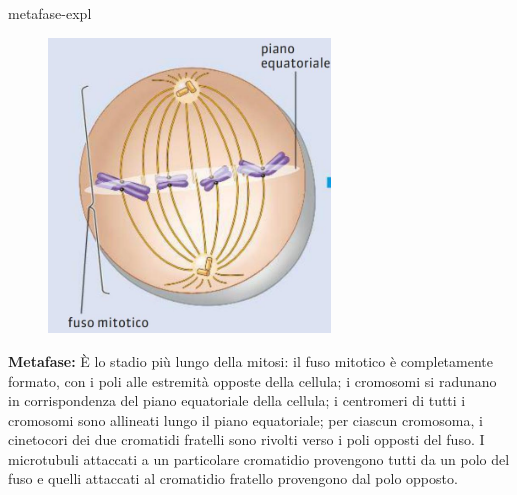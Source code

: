 \documentclass[preview]{standalone}
\begin{document}
\begin{snippet}{metafase-expl}
    \setlength{\intextsep}{0pt}%
    \begin{figure}
        \includegraphics[width=7.5cm]{./resources/metafase.jpg}
        \vspace{-1cm}
    \end{figure}

    \textbf{Metafase:}
    È lo stadio più lungo della mitosi: il fuso mitotico è completamente formato, con i poli alle
    estremità opposte della cellula; i cromosomi si radunano in corrispondenza del piano
    equatoriale della cellula; i centromeri di tutti i cromosomi sono allineati lungo il piano
    equatoriale; per ciascun cromosoma, i cinetocori dei due cromatidi fratelli sono rivolti verso
    i poli opposti del fuso. I microtubuli attaccati a un particolare cromatidio provengono tutti da
    un polo del fuso e quelli attaccati al cromatidio fratello provengono dal polo opposto.
    \wrapfill
\end{snippet}
\end{document}
